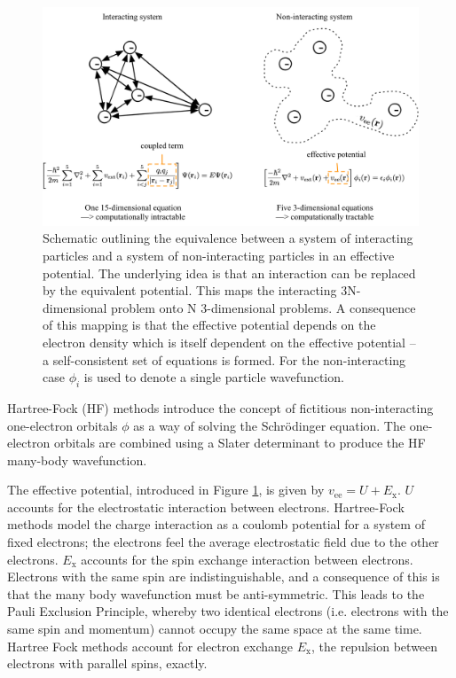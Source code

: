 \begin{figure}[h]
\centering
  \includegraphics[width=1.0\columnwidth]{figures/ch3/decouple.png}
  \caption[Interacting and non-interacting particle systems]{Schematic outlining the equivalence between a system of interacting particles and a system of non-interacting particles in an effective potential. The underlying idea is that an interaction can be replaced by the equivalent potential. This maps the interacting 3N-dimensional problem onto N 3-dimensional problems. A consequence of this mapping is that the effective potential depends on the electron density which is itself dependent on the effective potential -- a self-consistent set of equations is formed. For the non-interacting case $\phi_i$ is used to denote a single particle wavefunction.} %
  \label{decouple}
\end{figure}



Hartree-Fock (HF) methods introduce the concept of fictitious non-interacting one-electron orbitals $\phi$ as a way of solving the Schr\"{o}dinger equation. The one-electron orbitals are combined using a Slater determinant to produce the HF many-body wavefunction.\autocite{Burke2007} 

The effective potential, introduced in Figure \ref{decouple}, is given by $v_{\textrm{ee}} = U + E_{\mathrm{x}}$. $U$ accounts for the electrostatic interaction between electrons. Hartree-Fock methods model the charge interaction as a coulomb potential for a system of fixed electrons; the electrons feel the average electrostatic field due to the other electrons.
$E_\mathrm{x}$ accounts for the spin exchange interaction between electrons.
Electrons with the same spin are indistinguishable, and a consequence of this is that the many body wavefunction must be anti-symmetric. This leads to the Pauli Exclusion Principle, whereby two identical electrons (i.e. electrons with the same spin and momentum) cannot occupy the same space at the same time.
Hartree Fock methods account for electron exchange $E_\mathrm{x}$, the repulsion between electrons with parallel spins, exactly. 

